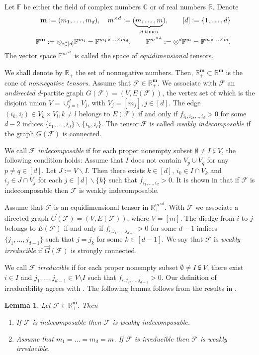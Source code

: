 \documentclass{amsart}
\newcommand{\digraph}{\vec{G}}
\newcommand{\C}{\mathbb{C}}
\newcommand{\F}{\mathbb{F}}
\newcommand{\R}{\mathbb{R}}
\newcommand{\m}{\mathbf{m}}
\newcommand{\0}{\mathbf{0}}
\newcommand{\1}{\mathbf{1}}
\newcommand{\cF}{\mathcal{F}}
\newtheorem{lemma}[theo]{Lemma}
\theoremstyle{remark}
\numberwithin{equation}{section} %
\begin{document}
Let $\F$ be either the field of complex numbers $\C$ or of real numbers $\R$.
 Denote
 \begin{eqnarray}\label{defbm}
 &&\m:=(m_1,\ldots,m_d),\quad m^{\times d}:=(\underbrace{m,\ldots,m}_{d\;\text{times}}),
\qquad [d]:=\{1,\dots,d\}\\
%
 &&\F^\m:=\otimes_{i\in[d]} \F^{m_i}=\F^{m_1\times\ldots\times m_d}, \qquad
 \F^{m^{\times d}}:= \otimes^d \F^m=\F^{m\times \ldots\times m},\notag
 \end{eqnarray}
 The vector space $\F^{m^{\times d}}$ is called the space of \emph{equidimensional} tensors.
 
We shall denote by $\R_+$ the set of nonnegative numbers.
%
 Then, $\R_+^\m\subset \R^\m$ is the cone of {\em nonnegative tensors}.  Assume that $\cF\in \R_+^\m$.
 We associate with  $\cF$ an {\em undirected} $d$-partite graph
 $G(\cF)=(V,E(\cF))$, the vertex set of which is the disjoint union
 $V=\cup_{j=1}^d V_j$, with $V_j=[m_j], j\in [d]$.
 The edge $(i_k,i_l)\in V_k\times V_l, k\ne l$ belongs
 to $E(\cF)$ if and only if $f_{i_1,i_2,\ldots,i_d}>0$ for some $d-2$
 indices $\{i_1,\ldots,i_d\}\backslash\{i_k,i_l\}$.
 The tensor $\cF$ is called \emph{weakly indecomposable} if the graph $G(\cF)$ is connected.

 We call $\cF$ \emph{indecomposable} if for each proper nonempty subset
 $\emptyset \ne I\subsetneqq V$,
 the following
 condition holds:  Assume that $I$ does not contain $V_p\cup V_q$ for any $p\ne q \in [d]$.
 Let $J:=V\backslash I$.  Then there exists
 $k\in [d]$, %
 $i_k\in I\cap V_k$ and $i_j\in J\cap V_j$ for each $j\in [d]
 \backslash\{k\}$ such that $f_{i_1,\ldots,i_d}>0$.
 It is shown in \cite{FGH} that if $\cF$ is indecomposable then $\cF$ is
 weakly indecomposable.

 Assume that $\cF$ is an equidimensional tensor in $\R_+^{m^{\times d}}$.
 With $\cF$ we associate a directed graph $\digraph(\cF)=(V, E(\cF))$, where $V=[m]$.  The diedge from $i$ to $j$ belongs to $E(\cF)$
 if and only if $f_{i,j_1,\ldots,j_{d-1}}>0$ for some $d-1$ indices $\{j_1,\ldots,j_{d-1}\}$ such that $j=j_k$ for some $k\in[d-1]$.
 We say that $\cF$ is {\em weakly irreducible} if $\digraph(\cF)$ is strongly connected.

 We call $\cF$ \emph{irreducible} if for each proper nonempty subset
 $\emptyset \ne I\subsetneqq V$,
 there exist $i\in I$ and %
$j_1,\ldots,j_{d-1}\in V\setminus I$
 such that $f_{i,j_2,\ldots,j_{d-1}}>0$.
 Our definition of irreducibility agrees with \cite{Lim05,CPZ08,NQZ09}.
 The following lemma follows from the results in \cite{FGH}. 
 \begin{lemma}\label{strngimpweak}  Let $\cF\in \R_+^\m$.  Then
 \begin{enumerate}
 \item If $\cF$ is indecomposable then $\cF$ is weakly indecomposable.
 \item Assume that $m_1=\ldots=m_d=m$.  If $\cF$ is irreducible then $\cF$ is weakly irreducible.
 \end{enumerate}
 \end{lemma}
\end{document}
